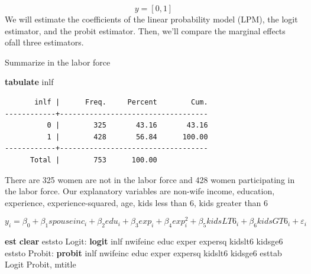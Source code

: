 \documentclass[
]{book}
\newenvironment{Shaded}{\begin{snugshade}}{\end{snugshade}}
\newcommand{\KeywordTok}[1]{\textcolor[rgb]{0.13,0.29,0.53}{\textbf{#1}}}
\newcommand{\NormalTok}[1]{#1}
\begin{document}
\[ y=[0,1] \]
We will estimate the coefficients of the linear probability model (LPM), the logit estimator, and the probit estimator. Then, we'll compare the marginal effects ofall three estimators.

Summarize in the labor force

\begin{Shaded}
\begin{Highlighting}[]
\KeywordTok{tabulate}\NormalTok{ inlf}
\end{Highlighting}
\end{Shaded}

\begin{verbatim}
       inlf |      Freq.     Percent        Cum.
------------+-----------------------------------
          0 |        325       43.16       43.16
          1 |        428       56.84      100.00
------------+-----------------------------------
      Total |        753      100.00
\end{verbatim}

There are 325 women are not in the labor force and 428 women participating in the labor force.
Our explanatory variables are non-wife income, education, experience, experience-squared, age, kids less than 6, kids greater than 6

\[ y_{i}=\beta_0 + \beta_1 spouseinc_{i} + \beta_2 edu_i + \beta_3 exp_i + \beta_4 exp^2_i + \beta_5 kidsLT6_i + \beta_6 kidsGT6_i + \varepsilon_i  \]

\begin{Shaded}
\begin{Highlighting}[]
\KeywordTok{est} \KeywordTok{clear}
\NormalTok{eststo Logit: }\KeywordTok{logit}\NormalTok{ inlf nwifeinc educ exper expersq kidslt6 kidsge6}
\NormalTok{eststo Probit: }\KeywordTok{probit}\NormalTok{ inlf nwifeinc educ exper expersq kidslt6 kidsge6}
\NormalTok{esttab Logit Probit, mtitle}
\end{Highlighting}
\end{Shaded}
\end{document}

